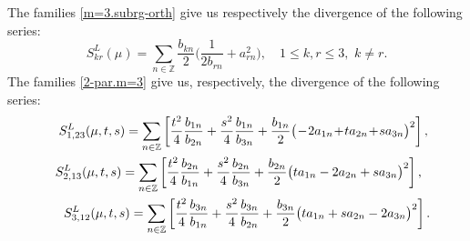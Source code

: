 \documentclass[preprint,12pt]{elsarticle}
\numberwithin{equation}{section}
\begin{document}
The families  \eqref{m=3.subrg-orth} give us respectively the divergence of the following series:
%
\begin{equation}
\label{S^L(kn)}
S^L_{kr}(\mu)=\sum_{n\in \mathbb Z}\frac{b_{kn}}{2}\Big(\frac{1}{2b_{rn}}+a_{rn}^2\Big),\quad1\leq k,r\leq 3,\,\,k\not=r.
\end{equation}
%
The families  \eqref{2-par.m=3} give us, respectively, the  divergence of the following series:
%
{\small
%  
\begin{eqnarray}
&& 
\label{S^{L}_{1,23}}
S^{L}_{1,23}(\mu,t,s)=\sum_{n\in{\mathbb
Z}}\left[\frac{t^2}{4}\frac{b_{1n}}{b_{2n}}+\frac{s^2}{4}\frac{b_{1n}}{b_{3n}}+
\frac{b_{1n}}{2}\big(\!-\!2a_{1n}\!+\!ta_{2n}\!+\!sa_{3n}\big)^2\right],\,
\\
%
&& 
\label{S^{L}_{2,31}}
S^{L}_{2,13}(\mu,t,s)=\sum_{n\in{\mathbb
Z}}\left[\frac{t^2}{4}\frac{b_{2n}}{b_{1n}}+ \frac{s^2}{4}\frac{b_{2n}}{b_{3n}}+
\frac{b_{2n}}{2}\big(ta_{1n}-2a_{2n}+sa_{3n}\big)^2\right],\,\,\,\,\\
%
&& 
\label{S^{L}_{3,12}}
S^{L}_{3,12}(\mu,t,s)=\sum_{n\in{\mathbb
Z}}\left[\frac{t^2}{4}\frac{b_{3n}}{b_{1n}}+ \frac{s^2}{4}\frac{b_{3n}}{b_{2n}}+
\frac{b_{3n}}{2}\big(ta_{1n}+sa_{2n}-2a_{3n}\big)^2\right].
\end{eqnarray}
}
\end{document}
